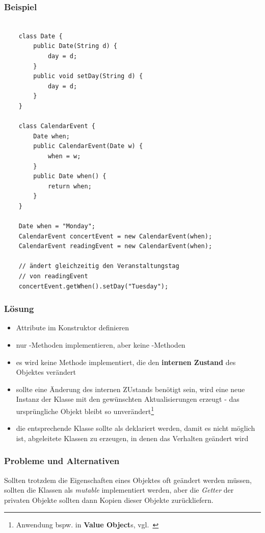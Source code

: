 \subsubsection*{Beispiel}

\begin{verbatim}

    class Date {
        public Date(String d) {
            day = d;
        }
        public void setDay(String d) {
            day = d;
        }
    }

    class CalendarEvent {
        Date when;
        public CalendarEvent(Date w) {
            when = w;
        }
        public Date when() {
            return when;
        }
    }

    Date when = "Monday";
    CalendarEvent concertEvent = new CalendarEvent(when);
    CalendarEvent readingEvent = new CalendarEvent(when);

    // ändert gleichzeitig den Veranstaltungstag
    // von readingEvent
    concertEvent.getWhen().setDay("Tuesday");

\end{verbatim}


\subsubsection*{Lösung}

\begin{itemize}
    \item Attribute im Konstruktor definieren
    \item nur -Methoden implementieren, aber keine -Methoden
    \item es wird keine Methode implementiert, die den \textbf{internen Zustand} des Objektes verändert
    \item sollte eine Änderung des internen ZUstands benötigt sein, wird eine neue Instanz der Klasse mit den
    gewünschten Aktualisierungen erzeugt - das ursprüngliche Objekt bleibt so unverändert\footnote{
        Anwendung bspw. in \textbf{Value Object}s, vgl.~\cite[486]{Fow03}
    }
    \item die entsprechende Klasse sollte als  deklariert werden, damit es nicht möglich ist, abgeleitete Klassen zu erzeugen, in denen das Verhalten geändert wird
\end{itemize}

\subsubsection*{Probleme und Alternativen}
Sollten trotzdem die Eigenschaften eines Objektes oft geändert werden müssen, sollten die Klassen als \textit{mutable} implementiert werden, aber die \textit{Getter} der privaten Objekte sollten dann Kopien dieser Objekte zurückliefern.

